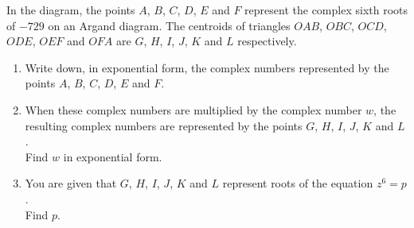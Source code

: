 \documentclass[leqno]{article}
\begin{document}
\begin{enumerate}[
  label=\textbf{\arabic*.},
  leftmargin=*,
  topsep=0pt,
  partopsep=0pt,
  parsep=0pt
]
\newpage

\questionitem

\begin{figure}[H]
    \centering
{}
\end{figure}


In the diagram, the points $A$, $B$, $C$, $D$, $E$ and $F$ represent the complex sixth roots of $-729$ on an Argand diagram. The centroids of triangles $OAB$, $OBC$, $OCD$, $ODE$, $OEF$ and $OFA$ are $G$, $H$, $I$, $J$, $K$ and $L$ respectively. \\
\begin{enumerate}[label=\textbf{(\alph*)}]
  \item Write down, in exponential form, the complex numbers represented by the points $A$, $B$, $C$, $D$, $E$ and $F$.  \\
  \item When these complex numbers are multiplied by the complex number $w$, the resulting complex numbers are represented by the points $G$, $H$, $I$, $J$, $K$ and $L$. \\
  Find $w$ in exponential form.  \\
  \item You are given that $G$, $H$, $I$, $J$, $K$ and $L$ represent roots of the equation $z^6=p$. \\
  Find $p$.  \\
\end{enumerate}


\newpage


\questionitem


\end{enumerate}
\end{document}
